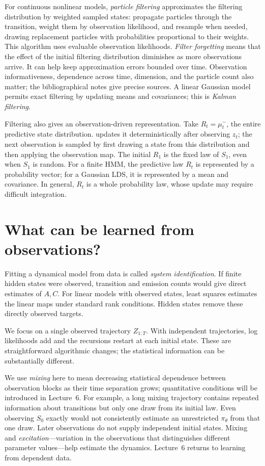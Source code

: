 \documentclass[11pt,twoside]{article}
\theoremstyle{definition}
\theoremstyle{remark}
\begin{document}
For continuous nonlinear models, \emph{particle filtering} approximates
the filtering distribution by weighted sampled states: propagate particles
through the transition, weight them by observation likelihood, and
resample when needed, drawing replacement particles with probabilities
proportional to their weights. This algorithm uses evaluable observation
likelihoods.
\emph{Filter forgetting} means that the effect of the initial filtering
distribution diminishes as more observations arrive. It can help keep
approximation errors bounded over time.
Observation informativeness, dependence across time, dimension, and the particle count
also matter; the bibliographical notes give precise sources.
A linear Gaussian model permits exact filtering by updating means and
covariances; this is \emph{Kalman filtering}.

Filtering also gives an observation-driven representation. Take
\(R_t=\mu_t^-\), the entire predictive state distribution.
 updates it deterministically after observing \(z_t\);
the next observation is sampled by first drawing a state from this
distribution and then applying the observation map. The initial
\(R_1\) is the fixed law of \(S_1\), even when \(S_1\) is random.
For a finite HMM, the predictive law $R_t$ is represented by a probability
vector; for a Gaussian LDS, it is represented by a mean and covariance. In
general, $R_t$ is a whole probability law,
whose update may require difficult integration.

\section{What can be learned from observations?}
\label{sec:estimation}

Fitting a dynamical model from data is called \emph{system identification}.
If finite hidden states were observed, transition and emission counts
would give direct estimates of \(A,C\). For linear models with observed
states, least squares estimates the linear maps under standard rank
conditions. Hidden states remove these directly observed targets.

We focus on a single observed trajectory \(Z_{1:T}\). With independent
trajectories, log likelihoods add and the recursions restart at each
initial state. These are straightforward algorithmic changes; the
statistical information can be substantially different.

We use \emph{mixing} here to mean decreasing statistical dependence
between observation blocks as their time separation grows; quantitative
conditions will be introduced in Lecture~6.
For example, a long mixing trajectory contains repeated information
about transitions but only one draw from its initial law. Even observing
\(S_0\) exactly would not consistently estimate an unrestricted
\(\pi_\theta\) from that one draw. Later observations do not supply
independent initial states. Mixing and \emph{excitation}---variation in
the observations that distinguishes different parameter values---help estimate the
dynamics.
Lecture~6 returns to learning from dependent data.
\end{document}
